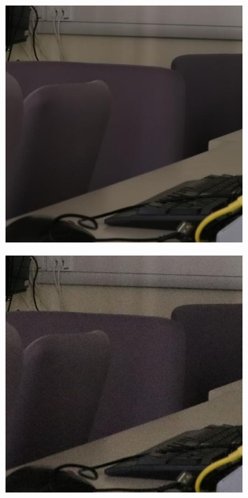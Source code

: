 \begin{figure}
\hfill
    \begin{subfigure}[t]{0.24\textwidth}
        \centering
        \includegraphics[width=1\textwidth]{images/dataset/Canon80D_8_8_6400_comproom_11_mean.JPG}
    \end{subfigure}
\hfill
    \begin{subfigure}[t]{0.24\textwidth}
        \centering
        \includegraphics[width=1\textwidth]{images/dataset/Canon80D_8_8_6400_comproom_11_real.JPG}

\end{subfigure}
\end{figure}

